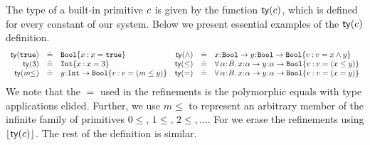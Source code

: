 %
The type of a built-in primitive $c$ is given by
the function ${\mathsf{ty}}(c)$, which is defined for every
constant of our system. Below we present essential
examples of the ${\mathsf{ty}}(c)$ definition.
%
{\small
$$\begin{array}{rclrcl}
{\mathsf{ty}}(\mathtt{true}) & \doteq & {{\texttt{Bool}}\{x \mathbin{:} x = \mathtt{true}\}} &
 {\mathsf{ty}}(\wedge) & \doteq & x\hspace{0.05em}{:}\hspace{0.05em} \texttt{Bool} \rightarrow y\hspace{0.05em}{:}\hspace{0.05em} \texttt{Bool} \rightarrow {\ensuremath{{\texttt{Bool}}\{v \mathbin{:} v = x \wedge y\}}} \\
{\mathsf{ty}}(3) & \doteq& {{\texttt{Int}}\{x \mathbin{:} x = 3\}} &
{\mathsf{ty}}(\leq) & \doteq & \forall\, \alpha\hspace{0.05em}{:}\hspace{0.05em} B.\, x\hspace{0.05em}{:}\hspace{0.05em} \alpha \rightarrow y\hspace{0.05em}{:}\hspace{0.05em} \alpha \rightarrow {\ensuremath{{\texttt{Bool}}\{v \mathbin{:} v = (x \leq y)\}}} \\
{\mathsf{ty}}(m\!\!\leq) & \doteq & y\hspace{0.05em}{:}\hspace{0.05em} \texttt{Int} \rightarrow {\ensuremath{{\texttt{Bool}}\{v \mathbin{:} v = (m \leq y)\}}} & 
{\mathsf{ty}}(=) & \doteq & \forall\, \alpha\hspace{0.05em}{:}\hspace{0.05em} B.\, x\hspace{0.05em}{:}\hspace{0.05em} \alpha \rightarrow y\hspace{0.05em}{:}\hspace{0.05em} \alpha \rightarrow {\ensuremath{{\texttt{Bool}}\{v \mathbin{:} v = (x = y)\}}}
\end{array}$$
}
We note that the $=$ used in the refinements is the polymorphic
equals with type applications elided.
%
Further, we use $m\!\!\leq$ to represent
an arbitrary member of the infinite family
of primitives $0\!\!\leq,\, 1\!\!\leq,\, 2\!\!\leq,\ldots$.
%
For \sysf we erase the refinements
using $\lfloor{{\mathsf{ty}}(\ensuremath{c})}\rfloor$.
%
The rest of the definition is similar.

